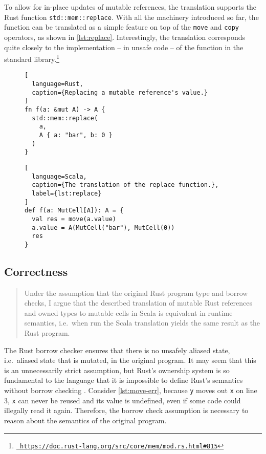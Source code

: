 To allow for in-place updates of mutable references, the translation supports
the  Rust function \lstinline!std::mem::replace!. With all the machinery
introduced so far, the function can be translated as a simple feature on top of
the \lstinline!move! and \lstinline!copy! operators, as shown in
\autoref{lst:replace}. Interestingly, the translation corresponds quite closely
to the implementation -- in unsafe code -- of the function in the standard
library.\footnote{\href{}{\texttt{\color{MidnightBlue}
https://doc.rust-lang.org/src/core/mem/mod.rs.html\#815}}}

\begin{figure}
\noindent\begin{minipage}[t]{.4\textwidth}
\begin{lstlisting}[
  language=Rust,
  caption={Replacing a mutable reference's value.}
]
fn f(a: &mut A) -> A {
  std::mem::replace(
    a,
    A { a: "bar", b: 0 }
  )
}
\end{lstlisting}
\end{minipage}\hfill
\begin{minipage}[t]{.55\textwidth}
\begin{lstlisting}[
  language=Scala,
  caption={The translation of the replace function.},
  label={lst:replace}
]
def f(a: MutCell[A]): A = {
  val res = move(a.value)
  a.value = A(MutCell("bar"), MutCell(0))
  res
}
\end{lstlisting}
\end{minipage}
\end{figure}



\subsection{Correctness}
\label{correctness-claim}

\begin{quote}
Under the assumption that the original Rust program type and borrow
checks, I argue that the described translation of mutable Rust
references and owned types to mutable cells in Scala is equivalent in
runtime semantics, i.e.~when run the Scala translation yields the same
result as the Rust program.
\end{quote}

The Rust borrow checker ensures that there is no unsafely aliased state,
i.e.~aliased state that is mutated, in the original program. It may seem that
this is an unnecessarily strict assumption, but Rust's ownership system is so
fundamental to the language that it is impossible to define Rust's semantics
without borrow checking \cite{krust}. Consider \autoref{lst:move-err}, because
\lstinline!y! moves out \lstinline!x! on line 3, \lstinline!x! can never be
reused and its value is undefined, even if some code could illegally read it
again. Therefore, the borrow check assumption is necessary to reason about the
semantics of the original program.

